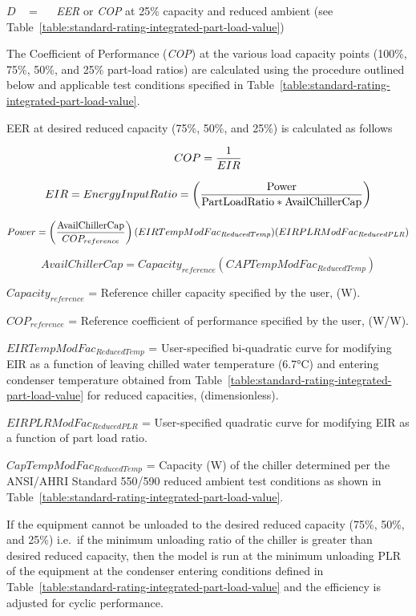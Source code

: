 \(D\) ~ = ~~ \emph{EER} or \emph{COP} at 25\% capacity and reduced ambient (see Table~\ref{table:standard-rating-integrated-part-load-value})

The Coefficient of Performance (\emph{COP}) at the various load capacity points (100\%, 75\%, 50\%, and 25\% part-load ratios) are calculated using the procedure outlined below and applicable test conditions specified in Table~\ref{table:standard-rating-integrated-part-load-value}.

EER at desired reduced capacity (75\%, 50\%, and 25\%) is calculated as follows

\begin{equation}
COP = \frac{{\rm{1}}}{{EIR}}
\end{equation}

\begin{equation}
EIR = EnergyInputRatio = \left( {\frac{{{\rm{Power }}}}{{{\rm{PartLoadRatio * AvailChillerCap}}}}} \right)
\end{equation}

\begin{equation}
Power = \left( {\frac{{{\rm{AvailChillerCap}}}}{{CO{P_{reference}}}}} \right)(EIRTempModFa{c_{ReducedTemp}})(EIRPLRModFa{c_{ReducedPLR}})
\end{equation}

\begin{equation}
AvailChillerCap = Capacit{y_{reference}}(CAPTempModFa{c_{ReducedTemp}})
\end{equation}

\(Capacit{y_{reference}}\) = Reference chiller capacity specified by the user, (W).

\(CO{P_{reference}}\) = Reference coefficient of performance specified by the user, (W/W).

\(EIRTempModFa{c_{ReducedTemp}}\) = User-specified bi-quadratic curve for modifying EIR as a function of leaving chilled water temperature (6.7°C) and entering condenser temperature obtained from Table~\ref{table:standard-rating-integrated-part-load-value} for reduced capacities, (dimensionless).

\(EIRPLRModFa{c_{ReducedPLR}}\) = User-specified quadratic curve for modifying EIR as a function of part load ratio.

\(CapTempModFa{c_{ReducedTemp}}\) = Capacity (W) of the chiller determined per the ANSI/AHRI Standard 550/590 reduced ambient test conditions as shown in Table~\ref{table:standard-rating-integrated-part-load-value}.

If the equipment cannot be unloaded to the desired reduced capacity (75\%, 50\%, and 25\%) i.e.~if the minimum unloading ratio of the chiller is greater than desired reduced capacity, then the model is run at the minimum unloading PLR of the equipment at the condenser entering conditions defined in Table~\ref{table:standard-rating-integrated-part-load-value} and the efficiency is adjusted for cyclic performance.

